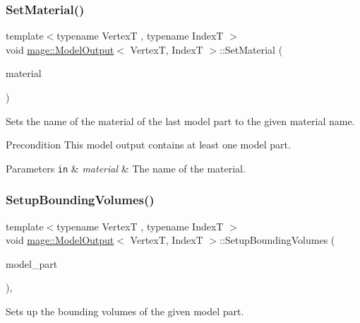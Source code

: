 \subsubsection{\texorpdfstring{Set\+Material()}{SetMaterial()}}
{\footnotesize\ttfamily template$<$typename VertexT , typename IndexT $>$ \\
void \hyperlink{structmage_1_1_model_output}{mage\+::\+Model\+Output}$<$ VertexT, IndexT $>$\+::Set\+Material (\begin{DoxyParamCaption}\item[{string}]{material }\end{DoxyParamCaption})}

Sets the name of the material of the last model part to the given material name.

\begin{DoxyPrecond}{Precondition}
This model output contains at least one model part. 
\end{DoxyPrecond}

\begin{DoxyParams}[1]{Parameters}
\mbox{\tt in}  & {\em material} & The name of the material. \\
\hline
\end{DoxyParams}
\hypertarget{structmage_1_1_model_output_acecfa6de92e27b435ef15cc02640e992}{}\label{structmage_1_1_model_output_acecfa6de92e27b435ef15cc02640e992} 
\subsubsection{\texorpdfstring{Setup\+Bounding\+Volumes()}{SetupBoundingVolumes()}}
{\footnotesize\ttfamily template$<$typename VertexT , typename IndexT $>$ \\
void \hyperlink{structmage_1_1_model_output}{mage\+::\+Model\+Output}$<$ VertexT, IndexT $>$\+::Setup\+Bounding\+Volumes (\begin{DoxyParamCaption}\item[{\hyperlink{structmage_1_1_model_part}{Model\+Part} \&}]{model\+\_\+part }\end{DoxyParamCaption})\hspace{0.3cm}{\ttfamily [private]}, {\ttfamily [noexcept]}}

Sets up the bounding volumes of the given model part.


